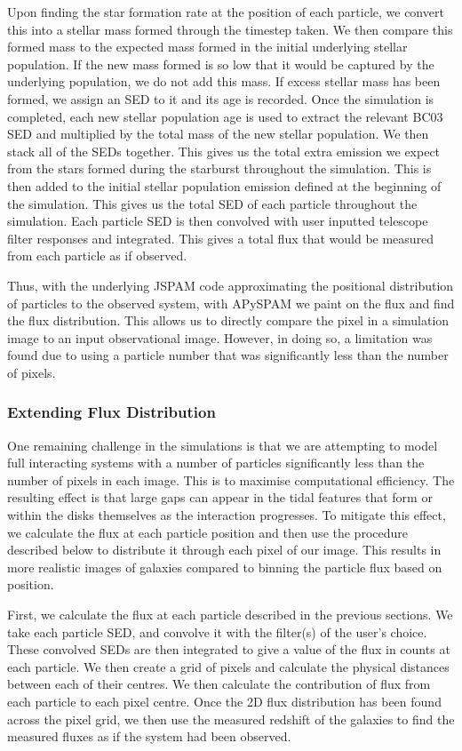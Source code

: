Upon finding the star formation rate at the position of each particle, we convert this into a stellar mass formed through the timestep taken. We then compare this formed mass to the expected mass formed in the initial underlying stellar population. If the new mass formed is so low that it would be captured by the underlying population, we do not add this mass. If excess stellar mass has been formed, we assign an SED to it and its age is recorded. Once the simulation is completed, each new stellar population age is used to extract the relevant BC03 SED and multiplied by the total mass of the new stellar population. We then stack all of the SEDs together. This gives us the total extra emission we expect from the stars formed during the starburst throughout the simulation. This is then added to the initial stellar population emission defined at the beginning of the simulation. This gives us the total SED of each particle throughout the simulation. Each particle SED is then convolved with user inputted telescope filter responses and integrated. This gives a total flux that would be measured from each particle as if observed. 

Thus, with the underlying JSPAM code approximating the positional distribution of particles to the observed system, with APySPAM we paint on the flux and find the flux distribution. This allows us to directly compare the pixel in a simulation image to an input observational image. However, in doing so, a limitation was found due to using a particle number that was significantly less than the number of pixels.

\subsubsection{Extending Flux Distribution}\label{flux_dist}
\noindent One remaining challenge in the simulations is that we are attempting to model full interacting systems with a number of particles significantly less than the number of pixels in each image. This is to maximise computational efficiency. The resulting effect is that large gaps can appear in the tidal features that form or within the disks themselves as the interaction progresses. To mitigate this effect, we calculate the flux at each particle position and then use the procedure described below to distribute it through each pixel of our image. This results in more realistic images of galaxies compared to binning the particle flux based on position.

First, we calculate the flux at each particle described in the previous sections. We take each particle SED, and convolve it with the filter(s) of the user's choice. These convolved SEDs are then integrated to give a value of the flux in counts at each particle. We then create a grid of pixels and calculate the physical distances between each of their centres. We then calculate the contribution of flux from each particle to each pixel centre. Once the 2D flux distribution has been found across the pixel grid, we then use the measured redshift of the galaxies to find the measured fluxes as if the system had been observed.

